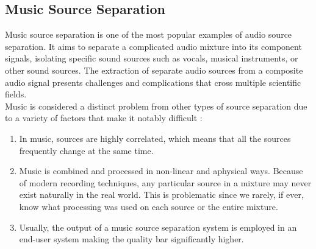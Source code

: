 \subsection{Music Source Separation}
Music source separation is one of the most popular examples of audio source separation. It aims to separate a complicated audio mixture into its component signals, isolating specific sound sources such as vocals, musical instruments, or other sound sources. The extraction of separate audio sources from a composite audio signal presents challenges and complications that cross multiple scientific fields.\\
Music is considered a distinct problem from other types of source separation due to a variety of factors that make it notably difficult \cite{cano2019}:
\begin{enumerate}
    \item In music, sources are highly correlated, which means that all the sources frequently change at the same time.
    \item Music is combined and processed in non-linear and aphysical ways. Because of modern recording techniques, any particular source in a mixture may never exist naturally in the real world. This is problematic since we rarely, if ever, know what processing was used on each source or the entire mixture.
    \item Usually, the output of a music source separation system is employed in an end-user system making the quality bar significantly higher.
\end{enumerate}

